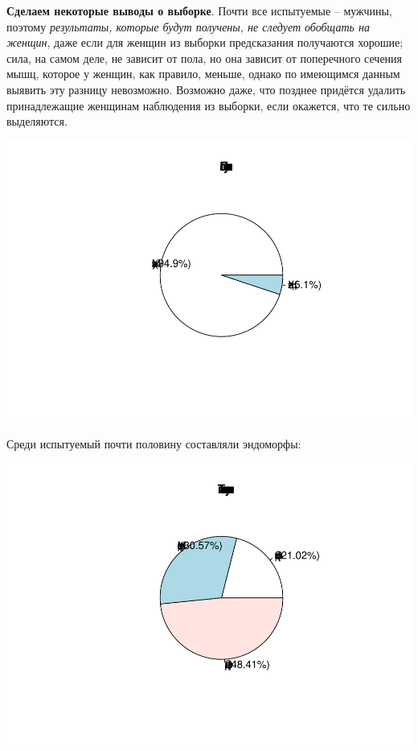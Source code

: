 \documentclass[
]{article}
\begin{document}
\textbf{Сделаем некоторые выводы о выборке}. Почти все испытуемые --
мужчины, поэтому \emph{результаты, которые будут получены, не следует
обобщать на женщин}, даже если для женщин из выборки предсказания
получаются хорошие; сила, на самом деле, не зависит от пола, но она
зависит от поперечного сечения мышц, которое у женщин, как правило,
меньше, однако по имеющимся данным выявить эту разницу невозможно.
Возможно даже, что позднее придётся удалить принадлежащие женщинам
наблюдения из выборки, если окажется, что те сильно выделяются.

\begin{center}\includegraphics{Regression-model-for-estimating-RM_files/figure-latex/unnamed-chunk-4-1} \end{center}

Среди испытуемый почти половину составляли эндоморфы:

\begin{center}\includegraphics{Regression-model-for-estimating-RM_files/figure-latex/unnamed-chunk-5-1} \end{center}
\end{document}
